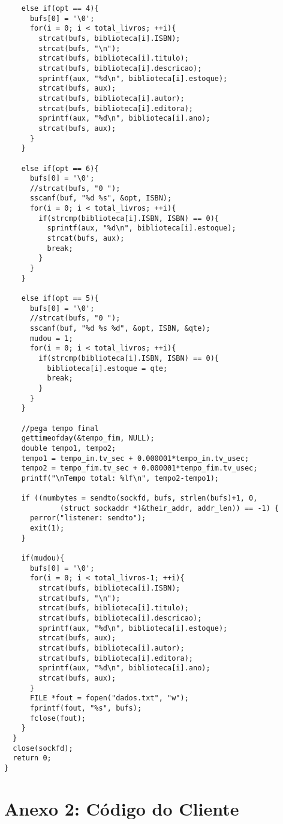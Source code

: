\documentclass[11pt, brazil]{article} %
\begin{document}
\begin{verbatim}
    else if(opt == 4){
      bufs[0] = '\0';
      for(i = 0; i < total_livros; ++i){
        strcat(bufs, biblioteca[i].ISBN);
        strcat(bufs, "\n");
        strcat(bufs, biblioteca[i].titulo);
        strcat(bufs, biblioteca[i].descricao);
        sprintf(aux, "%d\n", biblioteca[i].estoque);
        strcat(bufs, aux);
        strcat(bufs, biblioteca[i].autor);
        strcat(bufs, biblioteca[i].editora);
        sprintf(aux, "%d\n", biblioteca[i].ano);
        strcat(bufs, aux);
      }
    }
		    	
    else if(opt == 6){
      bufs[0] = '\0';
      //strcat(bufs, "0 ");
      sscanf(buf, "%d %s", &opt, ISBN);
      for(i = 0; i < total_livros; ++i){
        if(strcmp(biblioteca[i].ISBN, ISBN) == 0){
          sprintf(aux, "%d\n", biblioteca[i].estoque);
          strcat(bufs, aux);
          break;
        }		    				
      }
    }
		    	
    else if(opt == 5){
      bufs[0] = '\0';
      //strcat(bufs, "0 ");
      sscanf(buf, "%d %s %d", &opt, ISBN, &qte);
      mudou = 1;
      for(i = 0; i < total_livros; ++i){
        if(strcmp(biblioteca[i].ISBN, ISBN) == 0){
          biblioteca[i].estoque = qte;
          break;
        }		    				
      }
    }
       
    //pega tempo final
    gettimeofday(&tempo_fim, NULL);
    double tempo1, tempo2;
    tempo1 = tempo_in.tv_sec + 0.000001*tempo_in.tv_usec;
    tempo2 = tempo_fim.tv_sec + 0.000001*tempo_fim.tv_usec;
    printf("\nTempo total: %lf\n", tempo2-tempo1);

    if ((numbytes = sendto(sockfd, bufs, strlen(bufs)+1, 0,
             (struct sockaddr *)&their_addr, addr_len)) == -1) {
      perror("listener: sendto");
      exit(1);
    }                                
				
    if(mudou){
      bufs[0] = '\0';
      for(i = 0; i < total_livros-1; ++i){
        strcat(bufs, biblioteca[i].ISBN);
        strcat(bufs, "\n");
        strcat(bufs, biblioteca[i].titulo);
        strcat(bufs, biblioteca[i].descricao);
        sprintf(aux, "%d\n", biblioteca[i].estoque);
        strcat(bufs, aux);
        strcat(bufs, biblioteca[i].autor);
        strcat(bufs, biblioteca[i].editora);
        sprintf(aux, "%d\n", biblioteca[i].ano);
        strcat(bufs, aux);			
      }
      FILE *fout = fopen("dados.txt", "w");
      fprintf(fout, "%s", bufs);
      fclose(fout);
    }
  }					
  close(sockfd);
  return 0;
}
\end{verbatim}


\section*{Anexo 2: Código do Cliente}
\end{document}
